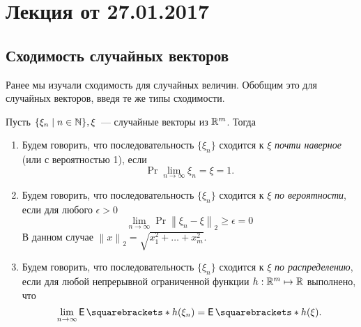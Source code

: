 \section{Лекция от 27.01.2017}
\subsection{Сходимость случайных векторов}
Ранее мы изучали сходимость для случайных величин. Обобщим это для случайных векторов, введя те же типы сходимости.
\begin{definition}
	Пусть \(\{\xi_n \mid n \in \mathbb{N}\}, \xi\)~--- случайные векторы из \(\mathbb{R}^m\). Тогда
	\begin{enumerate}
		\item Будем говорить, что последовательность \(\{\xi_n\}\) сходится к \(\xi\) \emph{почти наверное} (или с вероятностью 1), если
		\[
		\Pr{\lim\limits_{n \to \infty}\xi_n = \xi} = 1.
		\]
		\item Будем говорить, что последовательность \(\{\xi_n\}\) сходится к \(\xi\) \emph{по вероятности}, если для любого \(\epsilon > 0\)
		\[
		\lim\limits_{n \to \infty} \Pr{\left\|\xi_n - \xi\right\|_2 \geq \epsilon} = 0
		\]
		В данном случае \(\left\|x\right\|_2 = \sqrt{x_1^2 + \dots + x_m^2}\).
		\item Будем говорить, что последовательность \(\{\xi_n\}\) сходится к \(\xi\) \emph{по распределению}, если для любой непрерывной ограниченной функции \(h : \mathbb{R}^m \mapsto \mathbb{R}\) выполнено, что
		\[
		\lim\limits_{n \to \infty} \E{h(\xi_n)} = \E{h(\xi)}.
		\]
	\end{enumerate}
\end{definition}

